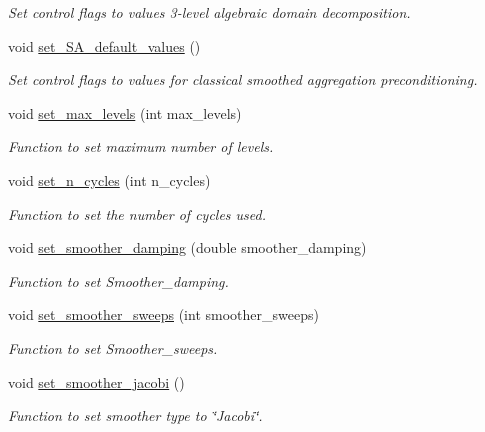 \begin{DoxyCompactItemize}
\begin{DoxyCompactList}\small\item\em Set control flags to values 3-\/level algebraic domain decomposition. \end{DoxyCompactList}\item 
void \hyperlink{classoomph_1_1TrilinosMLPreconditioner_ae5eae67f55f43c4b5be04635e5c844af}{set\+\_\+\+S\+A\+\_\+default\+\_\+values} ()
\begin{DoxyCompactList}\small\item\em Set control flags to values for classical smoothed aggregation preconditioning. \end{DoxyCompactList}\item 
void \hyperlink{classoomph_1_1TrilinosMLPreconditioner_a1f3c1aa0c8397df016e9eca960b51708}{set\+\_\+max\+\_\+levels} (int max\+\_\+levels)
\begin{DoxyCompactList}\small\item\em Function to set maximum number of levels. \end{DoxyCompactList}\item 
void \hyperlink{classoomph_1_1TrilinosMLPreconditioner_a4124512fc8fe6295243b563995f2a53e}{set\+\_\+n\+\_\+cycles} (int n\+\_\+cycles)
\begin{DoxyCompactList}\small\item\em Function to set the number of cycles used. \end{DoxyCompactList}\item 
void \hyperlink{classoomph_1_1TrilinosMLPreconditioner_ad50d31b7fba64341e5b6000ee92663cc}{set\+\_\+smoother\+\_\+damping} (double smoother\+\_\+damping)
\begin{DoxyCompactList}\small\item\em Function to set Smoother\+\_\+damping. \end{DoxyCompactList}\item 
void \hyperlink{classoomph_1_1TrilinosMLPreconditioner_a1479a57d840c6a3474de020bd0ed81ad}{set\+\_\+smoother\+\_\+sweeps} (int smoother\+\_\+sweeps)
\begin{DoxyCompactList}\small\item\em Function to set Smoother\+\_\+sweeps. \end{DoxyCompactList}\item 
void \hyperlink{classoomph_1_1TrilinosMLPreconditioner_af3bf505781afe83648c6204064803265}{set\+\_\+smoother\+\_\+jacobi} ()
\begin{DoxyCompactList}\small\item\em Function to set smoother type to \char`\"{}\+Jacobi\char`\"{}. \end{DoxyCompactList}\item 

\end{DoxyCompactItemize}

